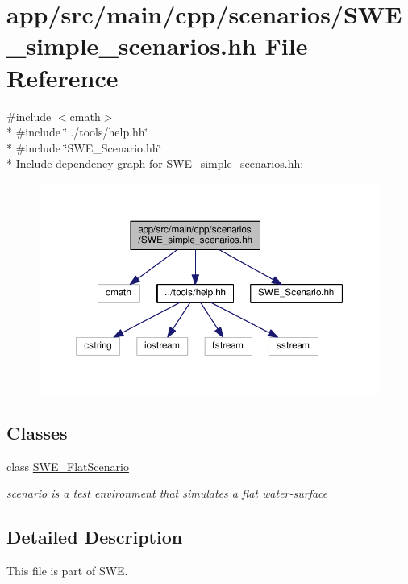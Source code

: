 \hypertarget{SWE__simple__scenarios_8hh}{}\section{app/src/main/cpp/scenarios/\+S\+W\+E\+\_\+simple\+\_\+scenarios.hh File Reference}
\label{SWE__simple__scenarios_8hh}
{\ttfamily \#include $<$cmath$>$}\\*
{\ttfamily \#include \char`\"{}../tools/help.\+hh\char`\"{}}\\*
{\ttfamily \#include \char`\"{}S\+W\+E\+\_\+\+Scenario.\+hh\char`\"{}}\\*
Include dependency graph for S\+W\+E\+\_\+simple\+\_\+scenarios.\+hh\+:\nopagebreak
\begin{figure}[H]
\begin{center}
\leavevmode
\includegraphics[width=350pt]{SWE__simple__scenarios_8hh__incl}
\end{center}
\end{figure}
\subsection*{Classes}
\begin{DoxyCompactItemize}
\item 
class \hyperlink{classSWE__FlatScenario}{S\+W\+E\+\_\+\+Flat\+Scenario}
\begin{DoxyCompactList}\small\item\em scenario is a test environment that simulates a flat water-\/surface \end{DoxyCompactList}\end{DoxyCompactItemize}


\subsection{Detailed Description}
This file is part of S\+WE.

